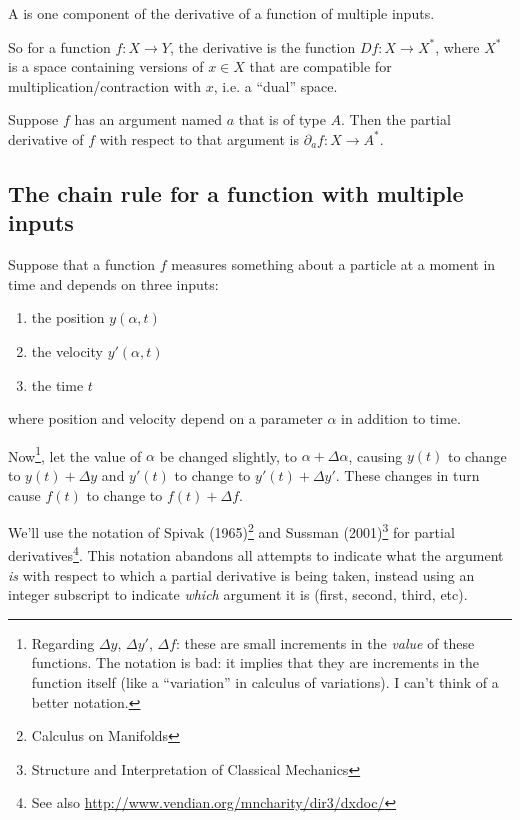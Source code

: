 \begin{definition*}
  A  is one component of the derivative of a function of multiple inputs.

  So for a function $f:X \to Y$, the derivative is the function $D f:X \to X^*$, where $X^*$ is a
  space containing versions of $x \in X$ that are compatible for multiplication/contraction with
  $x$, i.e. a ``dual'' space.

  Suppose $f$ has an argument named $a$ that is of type $A$. Then the partial derivative of $f$ with
  respect to that argument is $\partial_a{f}:X \to A^*$.
\end{definition*}

\subsection{The chain rule for a function with multiple inputs}

Suppose that a function $f$ measures something about a particle at a moment in time and depends on
three inputs:
\begin{enumerate}
\item the position $y(\alpha, t)$
\item the velocity $y'(\alpha, t)$
\item the time $t$
\end{enumerate}
where position and velocity depend on a parameter $\alpha$ in addition to time.

Now\footnote{Regarding $\Delta y$, $\Delta y'$, $\Delta f$: these are small increments in the
  \emph{value} of these functions. The notation is bad: it implies that they are increments in the
  function itself (like a ``variation'' in calculus of variations). I can't think of a better
  notation.}, let the value of $\alpha$ be changed slightly, to $\alpha + \Delta\alpha$, causing
$y(t)$ to change to $y(t) + \Delta y$ and $y'(t)$ to change to $y'(t) + \Delta y'$. These changes in
turn cause $f(t)$ to change to $f(t) + \Delta f$.

We'll use the notation of Spivak (1965)\footnote{Calculus on Manifolds} and Sussman
(2001)\footnote{Structure and Interpretation of Classical Mechanics} for partial
derivatives\footnote{See also \url{http://www.vendian.org/mncharity/dir3/dxdoc/}}. This notation
abandons all attempts to indicate what the argument \emph{is} with respect to which a partial
derivative is being taken, instead using an integer subscript to indicate \emph{which} argument it
is (first, second, third, etc).


